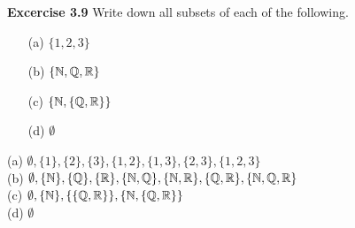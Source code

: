 \noindent
\textbf{Excercise 3.9} Write down all subsets of each of the following.

\begin{itemize}
  \item[(a)] $\{1, 2, 3\}$
  \item[(b)] $\{\mathbb{N}, \mathbb{Q}, \mathbb{R}\}$
  \item[(c)] $\{\mathbb{N}, \{\mathbb{Q}, \mathbb{R} \}\}$
  \item[(d)] $\emptyset$
\end{itemize}

\noindent
\Ans (a) $\emptyset, \{1\}, \{2\}, \{3\}, \{1, 2\}, \{1, 3\}, \{2, 3\}, \{1, 2, 3\}$ \\
\Ans (b) $\emptyset, \{\mathbb{N}\}, \{\mathbb{Q}\}, \{\mathbb{R}\}, \{\mathbb{N}, \mathbb{Q}\}, \{\mathbb{N}, \mathbb{R}\}, \{\mathbb{Q}, \mathbb{R}\}, \{\mathbb{N}, \mathbb{Q}, \mathbb{R}\}$ \\
\Ans (c) $\emptyset, \{\mathbb{N}\}, \{\{\mathbb{Q}, \mathbb{R}\}\}, \{\mathbb{N}, \{\mathbb{Q}, \mathbb{R}\}\}$ \\
\Ans (d) $\emptyset$
